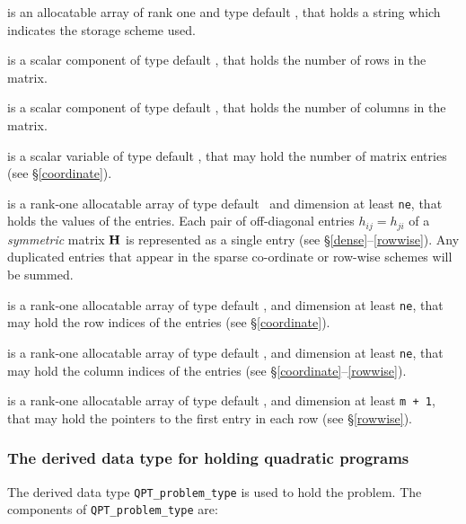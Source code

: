 \documentclass{galahad}
\newcommand{\packagename}{QPT}
\begin{document}
\begin{description}

 is an allocatable array of rank one and type default \character, that
holds a string which indicates the storage scheme used.

 is a scalar component of type default \integer,
that holds the number of rows in the matrix.

 is a scalar component of type default \integer,
that holds the number of columns in the matrix.

 is a scalar variable of type default \integer, that may
hold the number of matrix entries (see \S\ref{coordinate}).

 is a rank-one allocatable array of type default \realdp\,
and dimension at least {\tt ne}, that holds the values of the entries.
Each pair of off-diagonal entries $h_{ij} = h_{ji}$ of a {\em symmetric}
matrix ${\mathbf{H}}$ is represented as a single entry
(see \S\ref{dense}--\ref{rowwise}).
Any duplicated entries that appear in the sparse
co-ordinate or row-wise schemes will be summed.

 is a rank-one allocatable array of type default \integer,
and dimension at least {\tt ne}, that may hold the row indices of the entries
(see \S\ref{coordinate}).

 is a rank-one allocatable array of type default \integer,
and dimension at least {\tt ne}, that may hold the column indices of the entries
(see \S\ref{coordinate}--\ref{rowwise}).

 is a rank-one allocatable array of type default \integer,
and dimension at least {\tt m + 1}, that may hold the pointers to
the first entry in each row (see \S\ref{rowwise}).

\end{description}


\subsubsection{The derived data type for holding quadratic programs}
\label{typeprob}

The derived data type
{\tt \packagename\_problem\_type}
is used to hold the problem.
The components of
{\tt \packagename\_problem\_type}
are:
\end{document}

